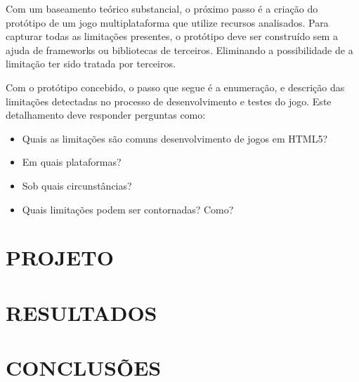\documentclass[
12pt,
a4paper,
portuges,
draft
]{report}
\begin{document}
Com um baseamento teórico substancial, o próximo passo é a criação
do protótipo de um jogo multiplataforma que utilize recursos
analisados. Para capturar todas as limitações presentes, o protótipo
deve ser construído sem a ajuda de frameworks ou bibliotecas de
terceiros. Eliminando a possibilidade de a limitação ter sido tratada
por terceiros.

Com o protótipo concebido, o passo que segue é a enumeração, e
descrição das limitações detectadas no processo de desenvolvimento e
testes do jogo. Este detalhamento deve responder perguntas como:

\begin{itemize}
\item Quais as limitações são comuns desenvolvimento de jogos em HTML5?
\item Em quais plataformas?
\item Sob quais circunstâncias?
\item Quais limitações podem ser contornadas? Como?
\end{itemize}

\chapter{PROJETO}
\thispagestyle{myheadings}

\chapter{RESULTADOS}
\thispagestyle{myheadings}

\chapter{CONCLUSÕES}
\thispagestyle{myheadings}


\clearpage
\markboth{}{}
\printbibliography[heading=bibintoc,title={REFERÊNCIAS BIBLIOGRÁFICAS}]
\markboth{}{}
\appendix

\end{document}
